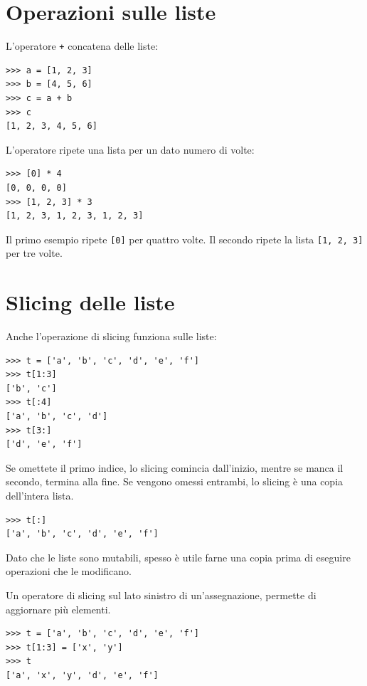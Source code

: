 \documentclass[10pt]{book}
\begin{document}
\section{Operazioni sulle liste}

L'operatore {\tt +} concatena delle liste:

\begin{verbatim}
>>> a = [1, 2, 3]
>>> b = [4, 5, 6]
>>> c = a + b
>>> c
[1, 2, 3, 4, 5, 6]
\end{verbatim}
%
L'operatore {\tt *} ripete una lista per un dato numero di volte:

\begin{verbatim}
>>> [0] * 4
[0, 0, 0, 0]
>>> [1, 2, 3] * 3
[1, 2, 3, 1, 2, 3, 1, 2, 3]
\end{verbatim}
%
Il primo esempio ripete {\tt [0]} per quattro volte. Il secondo ripete la lista {\tt [1, 2, 3]} per tre volte.


\section{Slicing delle liste}

Anche l'operazione di slicing funziona sulle liste:

\begin{verbatim}
>>> t = ['a', 'b', 'c', 'd', 'e', 'f']
>>> t[1:3]
['b', 'c']
>>> t[:4]
['a', 'b', 'c', 'd']
>>> t[3:]
['d', 'e', 'f']
\end{verbatim}
%
Se omettete il primo indice, lo slicing comincia dall'inizio, mentre se manca il secondo, termina alla fine. Se vengono omessi entrambi, lo slicing è una copia dell'intera lista.

\begin{verbatim}
>>> t[:]
['a', 'b', 'c', 'd', 'e', 'f']
\end{verbatim}
%
Dato che le liste sono mutabili, spesso è utile farne una copia prima di eseguire operazioni che le modificano.

Un operatore di slicing sul lato sinistro di un'assegnazione, permette di aggiornare più elementi.

\begin{verbatim}
>>> t = ['a', 'b', 'c', 'd', 'e', 'f']
>>> t[1:3] = ['x', 'y']
>>> t
['a', 'x', 'y', 'd', 'e', 'f']
\end{verbatim}
%
\end{document}
